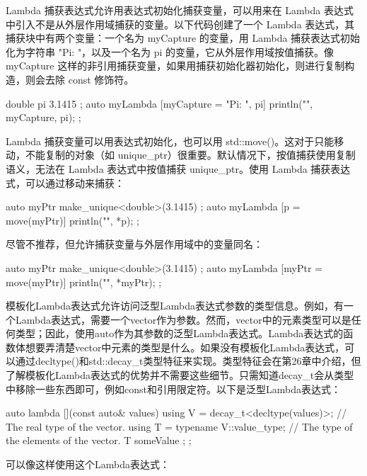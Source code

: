 Lambda 捕获表达式允许用表达式初始化捕获变量，可以用来在 Lambda 表达式中引入不是从外层作用域捕获的变量。以下代码创建了一个 Lambda 表达式，其捕获块中有两个变量：一个名为 myCapture 的变量，用 Lambda 捕获表达式初始化为字符串 "Pi: "，以及一个名为 pi 的变量，它从外层作用域按值捕获。像 myCapture 这样的非引用捕获变量，如果用捕获初始化器初始化，则进行复制构造，则会去除 const 修饰符。

\begin{cpp}
double pi { 3.1415 };
auto myLambda { [myCapture = "Pi: ", pi]{ println("{}{}", myCapture, pi); } };
\end{cpp}

Lambda 捕获变量可以用表达式初始化，也可以用 std::move()。这对于只能移动，不能复制的对象（如 unique\_ptr）很重要。默认情况下，按值捕获使用复制语义，无法在 Lambda 表达式中按值捕获 unique\_ptr。使用 Lambda 捕获表达式，可以通过移动来捕获：

\begin{cpp}
auto myPtr { make_unique<double>(3.1415) };
auto myLambda { [p = move(myPtr)]{ println("{}", *p); } };
\end{cpp}

尽管不推荐，但允许捕获变量与外层作用域中的变量同名：

\begin{cpp}
auto myPtr { make_unique<double>(3.1415) };
auto myLambda { [myPtr = move(myPtr)]{ println("{}", *myPtr); } };
\end{cpp}



模板化Lambda表达式允许访问泛型Lambda表达式参数的类型信息。例如，有一个Lambda表达式，需要一个vector作为参数。然而，vector中的元素类型可以是任何类型；因此，使用auto作为其参数的泛型Lambda表达式。Lambda表达式的函数体想要弄清楚vector中元素的类型是什么。如果没有模板化Lambda表达式，可以通过decltype()和std::decay\_t类型特征来实现。类型特征会在第26章中介绍，但了解模板化Lambda表达式的优势并不需要这些细节。只需知道decay\_t会从类型中移除一些东西即可，例如const和引用限定符。以下是泛型Lambda表达式：

\begin{cpp}
auto lambda { [](const auto& values) {
        using V = decay_t<decltype(values)>; // The real type of the vector.
        using T = typename V::value_type; // The type of the elements of the vector.
        T someValue { };
} };
\end{cpp}

可以像这样使用这个Lambda表达式：

